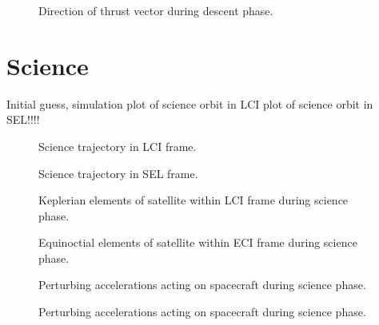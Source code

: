 \begin{figure}
\centering
\def\svgwidth{\figurewidth}

\caption{Direction of thrust vector during descent phase.}
\label{fig:Descent-thrust}
\end{figure}


\clearpage

\section{Science}
Initial guess, simulation
plot of science orbit in LCI
plot of science orbit in SEL!!!! 

\begin{figure}
\centering
\def\svgwidth{\figurewidth}

\caption{Science trajectory in LCI frame.}
\label{fig:Science-3D-lci}
\end{figure}

\begin{figure}
\centering
\def\svgwidth{\figurewidth}

\caption{Science trajectory in SEL frame.}
\label{fig:Science-3D-sel}
\end{figure}

\begin{figure}
\centering
\def\svgwidth{\figurewidth}

\caption{Keplerian elements of satellite within LCI frame during science phase.}
\label{fig:Science-kep-lci}
\end{figure}

\begin{figure}
\centering
\def\svgwidth{\figurewidth}

\caption{Equinoctial elements of satellite within ECI frame during science phase.}
\label{fig:Science-mee}
\end{figure}

\begin{figure}
\centering
\def\svgwidth{\figurewidth}

\caption{Perturbing accelerations acting on spacecraft during science phase.}
\label{fig:Science-pert}
\end{figure}

\begin{figure}
\centering
\def\svgwidth{\figurewidth}

\caption{Perturbing accelerations acting on spacecraft during science phase.}
\label{fig:Science-pert2}
\end{figure}


